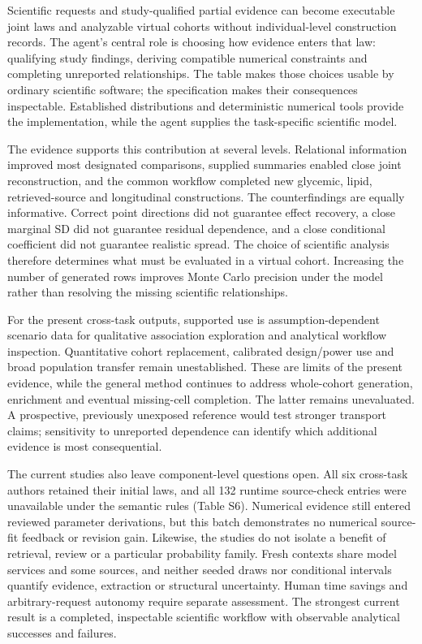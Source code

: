 \documentclass[10pt,twocolumn]{article}
\begin{document}
Scientific requests and study-qualified partial evidence can become executable joint laws and analyzable virtual cohorts without individual-level construction records. The agent's central role is choosing how evidence enters that law: qualifying study findings, deriving compatible numerical constraints and completing unreported relationships. The table makes those choices usable by ordinary scientific software; the specification makes their consequences inspectable. Established distributions and deterministic numerical tools provide the implementation, while the agent supplies the task-specific scientific model.


The evidence supports this contribution at several levels. Relational information improved most designated comparisons, supplied summaries enabled close joint reconstruction, and the common workflow completed new glycemic, lipid, retrieved-source and longitudinal constructions. The counterfindings are equally informative. Correct point directions did not guarantee effect recovery, a close marginal SD did not guarantee residual dependence, and a close conditional coefficient did not guarantee realistic spread. The choice of scientific analysis therefore determines what must be evaluated in a virtual cohort. Increasing the number of generated rows improves Monte Carlo precision under the model rather than resolving the missing scientific relationships.


For the present cross-task outputs, supported use is assumption-dependent scenario data for qualitative association exploration and analytical workflow inspection. Quantitative cohort replacement, calibrated design/power use and broad population transfer remain unestablished. These are limits of the present evidence, while the general method continues to address whole-cohort generation, enrichment and eventual missing-cell completion. The latter remains unevaluated. A prospective, previously unexposed reference would test stronger transport claims; sensitivity to unreported dependence can identify which additional evidence is most consequential.


The current studies also leave component-level questions open. All six cross-task authors retained their initial laws, and all 132 runtime source-check entries were unavailable under the semantic rules (Table S6). Numerical evidence still entered reviewed parameter derivations, but this batch demonstrates no numerical source-fit feedback or revision gain. Likewise, the studies do not isolate a benefit of retrieval, review or a particular probability family. Fresh contexts share model services and some sources, and neither seeded draws nor conditional intervals quantify evidence, extraction or structural uncertainty. Human time savings and arbitrary-request autonomy require separate assessment. The strongest current result is a completed, inspectable scientific workflow with observable analytical successes and failures.
\end{document}
